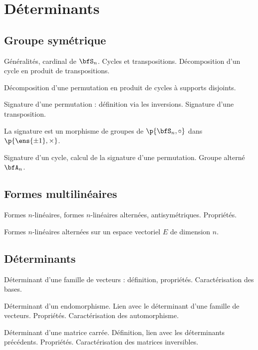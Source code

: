 \documentclass[a4paper,french,bookmarks]{article}
\begin{document}

    \section*{Déterminants}

    \subsection*{Groupe symétrique}

    \begin{enumerate}
        \ithand Généralités, cardinal de $\bfS_n$. Cycles et transpositions. Décomposition d'un
        cycle en produit de transpositions.
        
        \ithand Décomposition d'une permutation en produit de cycles à supports disjoints.
        
        \ithand Signature d'une permutation : définition via les inversions. Signature d'une
        transposition.
        
        \ithand La signature est un morphisme de groupes de $\p{\bfS_n, \circ}$ dans
        $\p{\ens{\pm 1}, \times}$.
        
        \ithand Signature d'un cycle, calcul de la signature d'une permutation. Groupe alterné
        $\bfA_n$.
    \end{enumerate}

    \subsection*{Formes multilinéaires}

    \begin{enumerate}
        \ithand Formes $n$-linéaires, formes $n$-linéaires alternées, antisymétriques.
        Propriétés.
        
        \ithand Formes $n$-linéaires alternées sur un espace vectoriel $E$ de dimension $n$.
    \end{enumerate}

    \subsection*{Déterminants}

    \begin{enumerate}
        \ithand Déterminant d'une famille de vecteurs : définition, propriétés. Caractérisation
        des bases.
        
        \ithand Déterminant d'un endomorphisme. Lien avec le déterminant d'une famille de
        vecteurs. Propriétés. Caractérisation des automorphisme.
        
        \ithand Déterminant d'une matrice carrée. Définition, lien avec les déterminants
        précédents. Propriétés. Caractérisation des matrices inversibles.
    \end{enumerate}
\end{document}
